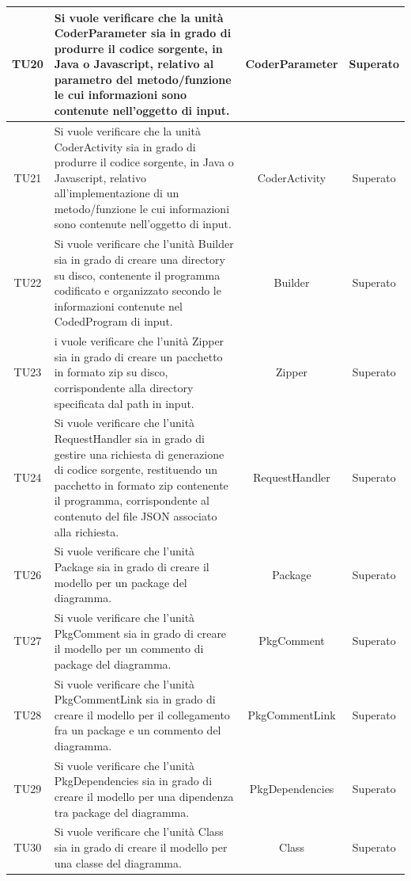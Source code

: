 \documentclass[../PianoDiQualifica.tex]{subfiles}
\begin{document}
\begin{longtable}{|c|>{\centering}p{8cm}|c|c|}
		\hline
		\hypertarget{TU20}{TU20}& Si vuole verificare che la unità CoderParameter sia in grado di produrre il codice sorgente, in Java o Javascript, relativo al parametro del metodo/funzione le cui informazioni sono contenute nell'oggetto di input.& CoderParameter&Superato\\
		\hline
		\hypertarget{TU21}{TU21}& Si vuole verificare che la unità CoderActivity sia in grado di produrre il codice sorgente, in Java o Javascript, relativo all'implementazione di un metodo/funzione le cui informazioni sono contenute nell'oggetto di input.& CoderActivity&Superato\\
		\hline
		\hypertarget{TU22}{TU22}& Si vuole verificare che l'unità Builder sia in grado di creare una directory su disco, contenente il programma codificato e organizzato secondo le informazioni contenute nel CodedProgram di input.& Builder&Superato\\
		\hline
		\hypertarget{TU23}{TU23}& i vuole verificare che l'unità Zipper sia in grado di creare un pacchetto in formato zip su disco, corrispondente alla directory specificata dal path in input.& Zipper &Superato\\
		\hline
		\hypertarget{TU24}{TU24}& Si vuole verificare che l'unità RequestHandler sia in grado di gestire una richiesta di generazione di codice sorgente, restituendo un pacchetto in formato zip contenente il programma, corrispondente al contenuto del file JSON associato alla richiesta. &RequestHandler &Superato\\
		\hline
		\hypertarget{TU26}{TU26}&Si vuole verificare che l'unità Package sia in grado di creare il modello per un package del diagramma.&Package &Superato\\
		\hline
		\hypertarget{TU27}{TU27}&Si vuole verificare che l'unità PkgComment sia in grado di creare il modello per un commento di package del diagramma. &PkgComment &Superato\\
		\hline
		\hypertarget{TU28}{TU28}&Si vuole verificare che l'unità PkgCommentLink sia in grado di creare il modello per il collegamento fra un package e un commento del diagramma. & PkgCommentLink&Superato\\
		\hline
		\hypertarget{TU29}{TU29}& Si vuole verificare che l'unità PkgDependencies sia in grado di creare il modello per una dipendenza tra package del diagramma. & PkgDependencies &Superato\\
		\hline
		\hypertarget{TU30}{TU30}&Si vuole verificare che l'unità Class sia in grado di creare il modello per una classe del diagramma. & Class&Superato\\

\end{longtable}
\end{document}
